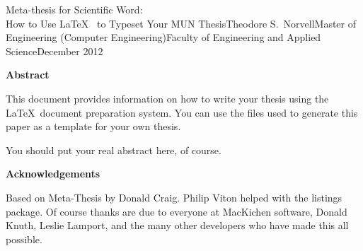                      

%
\addtocounter{page}{-1}%

\begin{comment}
To edit the title page, double click on the grey Title\ Page box below.
\end{comment}

\thesistitle
{Meta-thesis for Scientific Word:\\How to Use \LaTeX
\ to Typeset Your MUN Thesis}{Theodore S.~Norvell}{Master of Engineering (Computer Engineering)}{Faculty of Engineering and Applied Science}{December 2012}%

\newpage\renewcommand{\baselinestretch}{\double}%

\begin{center}
\textbf{\large Abstract}
\end{center}

This document provides information on how to write your thesis using the %
\LaTeX\ document preparation system. You can use the files used to generate
this paper as a template for your own thesis.

You should put your real abstract here, of course.

\newpage{}

\begin{center}
\textbf{\large Acknowledgements}
\end{center}

Based on Meta-Thesis by Donald Craig. Philip Viton helped with the listings
package. Of course thanks are due to everyone at MacKichen software, Donald
Knuth, Leslie Lamport, and the many other developers who have made this all
possible.

\renewcommand{\baselinestretch}{\single}

\tableofcontents%

